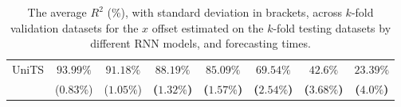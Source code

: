 \begin{table}[!ht]
{\begin{tabular}{|c|c|c|c|c|c|c|c|}
			\multirow{2}{*}{UniTS} & $93.99\%$ & $91.18\%$ & $\mathbf{88.19\%}$ & $\mathbf{85.09\%}$ & $\mathbf{69.54\%}$ & $\mathbf{42.6\%}$ & $\mathbf{23.39\%}$ \\
			 & ($0.83\%$) & ($1.05\%$) & \textbf{(}$\mathbf{1.32\%}$\textbf{)} & \textbf{(}$\mathbf{1.57\%}$\textbf{)} & \textbf{(}$\mathbf{2.54\%}$\textbf{)} & \textbf{(}$\mathbf{3.68\%}$\textbf{)} & \textbf{(}$\mathbf{4.0\%}$\textbf{)} \\ \hline
		\end{tabular}
	}
	\caption{The average $R^{2}$ (\%), with standard deviation in brackets, across $k$-fold validation datasets for the $x$ offset estimated on the $k$-fold testing datasets by different RNN models, and forecasting times.}
	\label{tab:all_longitude_no_abs_R2}
\end{table}

